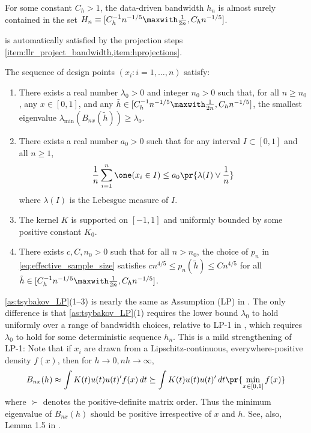 \documentclass[12pt, reqno]{amsart}
\numberwithin{equation}{section}
\begin{document}
\begin{refsection}
\begin{appendices}
\begin{as}
\label{as:bandwidth}
For some constant $C_h > 1$, the data-driven bandwidth $h_n$ is almost surely contained in
the set $H_n \equiv [C_h^ {-1} n^{-1/5}
\maxwith
\frac{1}{2n}, C_h n^{-1/5}]$.
\end{as}

 is automatically satisfied by the projection steps
\cref{item:llr_project_bandwidth,item:hprojections}.

\begin{as}
\label{as:tsybakov_LP}
The sequence of design points $(x_i : i =1, \ldots, n)$ satisfy:
\begin{enumerate}
  \item There exists a real number $\lambda_0 > 0$ and integer $n_0 > 0$ such that, for
  all $n \ge n_0$, any $x \in[0,1]$, and any $\tilde h
  \in [C_h^{-1} n^{-1/5} \maxwith
\frac{1}{2n}, C_h n^{-1/5}]$,  the
  smallest eigenvalue $\lambda_{\min}(B_{nx}(\tilde h)) \ge \lambda_0$.
  \item There exists a real number $a_0 > 0$ such that for any interval $I \subset [0,1]$
  and all $n \ge 1$, \[
\frac{1}{n} \sum_{i=1}^n \one(x_i \in I) \le a_0 \pr{\lambda(I) \vee \frac{1}{n}}
  \]
  where $\lambda(I)$ is the Lebesgue measure of $I$.
  \item The kernel $K$ is supported on $[-1,1]$ and uniformly bounded by some
  positive constant $K_0$.
  \item There exists $c, C, n_0 > 0$ such that for all $n > n_0$, the choice of $p_n$ in
  \eqref{eq:effective_sample_size} satisfies $c  n^{4/5}
  \le p_n(\tilde h)
  \le C n^
  {4/5}$ for all $\tilde h \in [C_h^{-1} n^
  {-1/5} \maxwith
\frac{1}{2n}, C_h n^{-1/5}]$.
\end{enumerate}
\end{as}

\cref{as:tsybakov_LP}(1--3) is nearly the same as Assumption (LP) in
\citet{tsybakov2008introduction}. The only difference is that \cref{as:tsybakov_LP}(1)
requires the lower bound $\lambda_0$ to hold uniformly over a range of bandwidth choices,
relative to LP-1 in \citet{tsybakov2008introduction}, which requires $\lambda_0$ to hold
for some deterministic sequence $h_n$.
This is a mild strengthening of LP-1: Note that if $x_i$ are drawn from a
Lipschitz-continuous, everywhere-positive density $f(x)$, then for $h \to 0, nh \to
\infty$, \[B_{nx}(h) \approx \int
K(t)u(t)u(t)' f(x) \,dt \succeq \int K(t) u(t)u(t)' \,dt \pr{\min_ {x
\in
[0,1]} f(x)}
\]
where $\succ$ denotes the positive-definite matrix order. Thus the minimum eigenvalue of
$B_{nx}(h)$ should be positive irrespective of $x$ and $h$. See, also, Lemma 1.5
in \citet{tsybakov2008introduction}.


\end{appendices}
\end{refsection}
\end{document}
